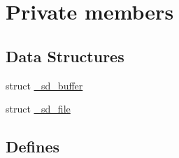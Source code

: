\hypertarget{group__sd__private}{\section{\-Private members}
\label{group__sd__private}
}
\subsection*{\-Data \-Structures}
\begin{DoxyCompactItemize}
\item 
struct \hyperlink{struct__sd__buffer}{\-\_\-sd\-\_\-buffer}
\item 
struct \hyperlink{struct__sd__file}{\-\_\-sd\-\_\-file}
\end{DoxyCompactItemize}
\subsection*{\-Defines}
